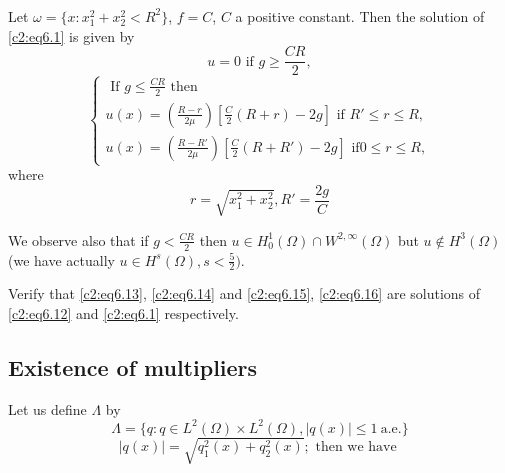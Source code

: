 \subsubsection{}

\begin{example}\label{c2:ex2}%
Let $\omega = \{x: x^2_1 + x^2_2 < R^2 \}$, $f = C$, $C$ a positive
constant. Then the solution of \eqref{c2:eq6.1} is given by  
\begin{equation}
u = 0 \text{ if } g \geq \frac{CR}{2}, \tag{6.15}\label{c2:eq6.15}  
\end{equation}
\begin{equation}
\begin{cases}
\text{ If } g \leq \frac{CR}{2} \text{ then }\\
u (x) = (\frac{R - r}{ 2 \mu}) [\frac{C}{2} (R + r) - 2 g] \text{ if }
R' \leq r \leq R,\\ 
u (x) = (\frac{R - R'}{ 2 \mu}) [\frac{C}{2} (R + R') - 2 g] \text{ if
} 0 \leq r \leq  R, 
\end{cases}
\tag{6.16}\label{c2:eq6.16}
\end{equation}
where 
\begin{equation*}
r= \sqrt{x^2_1 + x^2_2}, R' = \frac{2g}{C} 
\end{equation*} 
\end{example}

We observe also that if $g < \frac{CR}{2}$ then $u \in H^1_0
(\Omega ) \cap W^{2, \infty} (\Omega )$ but $u \notin H^3 (\Omega)$
(we have actually $u \in H^s (\Omega), s < \frac{5}{2})$. 

\begin{exercise}\label{c2:exer6.4}%
Verify that \eqref{c2:eq6.13}, \eqref{c2:eq6.14} and
\eqref{c2:eq6.15}, \eqref{c2:eq6.16} are 
solutions of \eqref{c2:eq6.12} and \eqref{c2:eq6.1} respectively.  
\end{exercise}

\subsection{Existence of multipliers}\label{c2:ss6.6}
 
Let us define $\Lambda $ by 
$$
\Lambda  = \{ q : q \in L^2 (\Omega ) \times L^2 (\Omega ), |q 
(x)| \leq 1 ~\text{a.e.} \} 
$$
$$
|q (x)|= \sqrt{q^2_1 (x) + q^2_2 (x)}; \text{ then we have }
$$\pageoriginale 

